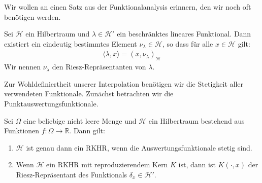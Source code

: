 Wir wollen an einen Satz aus der Funktionalanalysis erinnern, den wir noch oft benötigen werden.

\begin{theorem}
Sei $\mathcal{H}$ ein Hilbertraum und $\lambda \in \mathcal{H}'$ ein beschränktes lineares Funktional. Dann existiert ein eindeutig bestimmtes Element $\nu_\lambda \in \mathcal{H}$, so dass für alle $x \in \mathcal{H}$ gilt:
\begin{align*}
\langle \lambda, x \rangle = \left( x, \nu_\lambda \right)_\mathcal{H}
\end{align*}
Wir nennen $\nu_\lambda$ den Riesz-Repräsentanten von $\lambda$.
\end{theorem}

Zur Wohldefiniertheit unserer Interpolation benötigen wir die Stetigkeit aller verwendeten Funktionale. Zunächst betrachten wir die Punktauswertungsfunktionale.

\begin{theorem}
\label{stetig}
Sei $\Omega$ eine beliebige nicht leere Menge und $\mathcal{H}$ ein Hilbertraum bestehend aus Funktionen $f: \Omega \rightarrow \mathbb{R}$. Dann gilt:
\begin{enumerate}
\item \label{stetig1} $\mathcal{H}$ ist genau dann ein \ac{RKHR}, wenn die Auswertungsfunktionale stetig sind.
\item \label{stetig2} Wenn $\mathcal{H}$ ein \ac{RKHR} mit reproduzierendem Kern $K$ ist, dann ist $K(\cdot,x)$ der Riesz-Repräsentant des Funktionals $\delta_x \in \mathcal{H}'$.
\end{enumerate}
\end{theorem}

